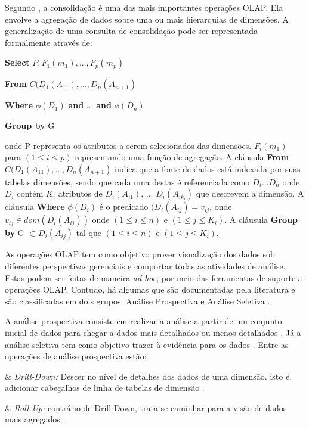 Segundo , a consolidação é uma das mais importantes operações OLAP. Ela envolve a agregação de dados sobre uma ou mais hierarquias de dimensões. A generalização de uma consulta de consolidação pode ser representada formalmente através de: 

\textbf{Select} $\displaystyle P,F_{1}(m_1),..., F_p(m_p)$

\textbf{From} $\displaystyle C(D_1(A_{11}),...,D_n(A_{n+1})$

\textbf{Where} $\displaystyle \phi(D_1)$ \textbf{and} ... \textbf{and}  $\displaystyle\phi(D_n)$

\textbf{Group by} G

onde P representa os atributos a serem selecionados das dimensões. $\displaystyle F_{i}(m_1)$ para $\displaystyle (1 \leq i \leq p) $ representando uma função de agregação. A cláusula \textbf{From} $\displaystyle C(D_1(A_{11}),...,D_n(A_{n+1})$ indica que a fonte de dados está indexada por suas tabelas dimensões, sendo que cada uma destas é referenciada como $\displaystyle D_i ... D_n $ onde  $\displaystyle D_i $ contém  $\displaystyle K_i$ atributos de  $\displaystyle D_i(A_{i1})$, ... $ \displaystyle D_i(A_{ik_{i}}) $ que descrevem a dimensão.  A cláusula \textbf{Where} $\displaystyle \phi(D_i)$ é o predicado $\displaystyle (D_i(A_{ij}) = v_{ij}$, onde $\displaystyle v_{ij} \in dom(D_i(A_{ij}))$ onde $\displaystyle (1 \leq i \leq n) $ e $\displaystyle (1 \leq j \leq K_{i}) $. A cláusula \textbf{Group by} G $\displaystyle \subset {D_{i}(A_{ij})} $ tal que $\displaystyle (1 \leq i \leq n) $ e $\displaystyle (1 \leq j \leq K_{i})$.


As operações OLAP tem como objetivo prover visualização dos dados sob diferentes perspectivas gerenciais e comportar todas as atividades de análise. Estas podem ser feitas de maneira \textit{ad hoc}, por meio das ferramentas de suporte a operações OLAP. Contudo, há algumas que são documentadas pela literatura e são classificadas em dois grupos: Análise Prospectiva e Análise Seletiva .

A análise prospectiva consiste em realizar a análise a partir de um conjunto inicial de dados para chegar a dados mais detalhados ou menos detalhados \cite{Inmon1992}. Já a análise seletiva tem como objetivo trazer à evidência para os dados \cite{andre2000}. Entre as operações de análise prospectiva estão:

\begin{easylist}[itemize]

& \textit{Drill-Down:} Descer no nível de detalhes dos dados de uma dimensão. isto é, adicionar cabeçalhos de linha de tabelas de dimensão \cite{Kimball2002}.

& \textit{Roll-Up:} contrário de Drill-Down, trata-se caminhar para a visão de dados mais agregados . 


\end{easylist}

